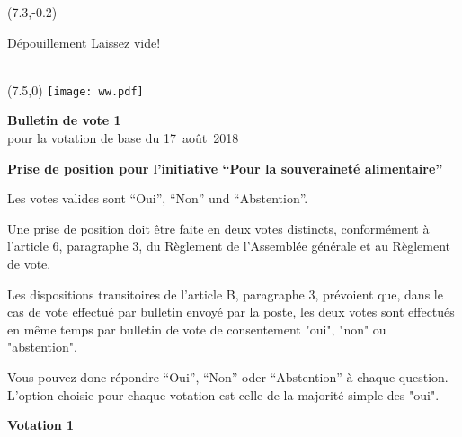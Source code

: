 \documentclass[11pt, a4paper]{scrartcl}
\begin{document}
{\begin{minipage}[t][12.5cm][t]{\textwidth}
\begin{textblock}{6}(7.3,-0.2)
\begin{framed}
Dépouillement \hfill Laissez vide! \\
\vspace{1.5cm} ~ \\
\end{framed}
\end{textblock}


\end{minipage}

\newpage

\begin{minipage}[t][12.5cm][t]{17.7cm}

\begin{textblock}{6}(7.5,0)
\texttt{[image: ww.pdf]}
\end{textblock}

{\LARGE\textbf{Bulletin de vote 1}} \\
pour la votation de base du 17~août~2018 \\

\vspace{2cm}

\textbf{Prise de position pour l'initiative \enquote{Pour la souveraineté alimentaire}}

\vspace{0.1cm}
Les votes valides sont \enquote{Oui}, \enquote{Non} und \enquote{Abstention}.

\vspace{0.1cm}
Une prise de position doit être faite en deux votes distincts, conformément à l'article 6, paragraphe 3, du Règlement de l'Assemblée générale et au Règlement de vote.

Les dispositions transitoires de l'article B, paragraphe 3, prévoient que, dans le cas de vote effectué par bulletin envoyé par la poste, les deux votes sont effectués en même temps par bulletin de vote de consentement "oui", "non" ou "abstention". 

\vspace{0.1cm}
Vous pouvez donc répondre \enquote{Oui}, \enquote{Non} oder \enquote{Abstention} à chaque question. L'option choisie pour chaque votation est celle de la majorité simple des "oui".

\vspace{1cm}

\textbf{Votation 1}

\vspace{0.5cm}


\end{minipage}}
\end{document}
